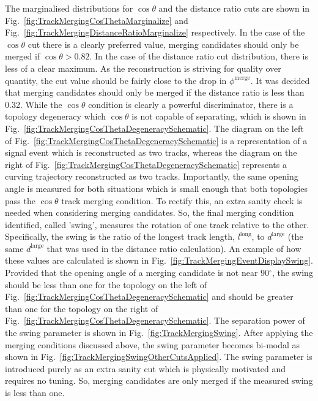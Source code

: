 The marginalised distributions for $\cos\theta$ and the distance ratio cuts are shown in Fig.~\ref{fig:TrackMergingCosThetaMarginalize} and Fig.~\ref{fig:TrackMergingDistanceRatioMarginalize} respectively.  In the case of the $\cos\theta$ cut there is a clearly preferred value, merging candidates should only be merged if $\cos\theta > 0.82$.  In the case of the distance ratio cut distribution, there is less of a clear maximum.  As the reconstruction is striving for quality over quantity, the cut value should be fairly close to the drop in $\phi^{\textrm{merge}}$.  It was decided that merging candidates should only be merged if the distance ratio is less than 0.32.
\newline
\newline
While the $\cos\theta$ condition is clearly a powerful discriminator, there is a topology degeneracy which $\cos\theta$ is not capable of separating, which is shown in Fig.~\ref{fig:TrackMergingCosThetaDegeneracySchematic}.  The diagram on the left of Fig.~\ref{fig:TrackMergingCosThetaDegeneracySchematic} is a representation of a signal event which is reconstructed as two tracks, whereas the diagram on the right of Fig.~\ref{fig:TrackMergingCosThetaDegeneracySchematic} represents a curving trajectory reconstructed as two tracks.  Importantly, the same opening angle is measured for both situations which is small enough that both topologies pass the $\cos\theta$ track merging condition.  To rectify this, an extra sanity check is needed when considering merging candidates.  So, the final merging condition identified, called 'swing', measures the rotation of one track relative to the other.  Specifically, the swing is the ratio of the longest track length, $l^{\textrm{long}}$, to $d^{\textrm{large}}$ (the same $d^{\textrm{large}}$ that was used in the distance ratio calculation).  An example of how these values are calculated is shown in Fig.~\ref{fig:TrackMergingEventDisplaySwing}.  Provided that the opening angle of a merging candidate is not near 90$^\circ$, the swing should be less than one for the topology on the left of Fig.~\ref{fig:TrackMergingCosThetaDegeneracySchematic} and should be greater than one for the topology on the right of Fig.~\ref{fig:TrackMergingCosThetaDegeneracySchematic}.  The separation power of the swing parameter is shown in Fig.~\ref{fig:TrackMergingSwing}.  After applying the merging conditions discussed above, the swing parameter becomes bi-modal as shown in Fig.~\ref{fig:TrackMergingSwingOtherCutsApplied}.  The swing parameter is introduced purely as an extra sanity cut which is physically motivated and requires no tuning.  So, merging candidates are only merged if the measured swing is less than one.
